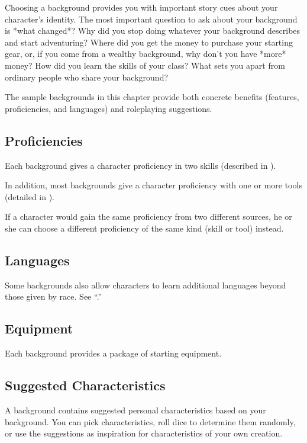 Choosing a background provides you with important story cues about your character's identity. The most important question to ask about your background is *what changed*? Why did you stop doing whatever your background describes and start adventuring? Where did you get the money to purchase your starting gear, or, if you come from a wealthy background, why don't you have *more* money? How did you learn the skills of your class? What sets you apart from ordinary people who share your background?

The sample backgrounds in this chapter provide both concrete benefits (features, proficiencies, and languages) and roleplaying suggestions.

\subsection{Proficiencies}

Each background gives a character proficiency in two skills (described in ).

In addition, most backgrounds give a character proficiency with one or more tools (detailed in ).

If a character would gain the same proficiency from two different sources, he or she can choose a different proficiency of the same kind (skill or tool) instead.

\subsection{Languages}

Some backgrounds also allow characters to learn additional languages beyond those given by race. See “.”

\subsection{Equipment}

Each background provides a package of starting equipment.

\subsection{Suggested Characteristics}

A background contains suggested personal characteristics based on your background. You can pick characteristics, roll dice to determine them randomly, or use the suggestions as inspiration for characteristics of your own creation.

